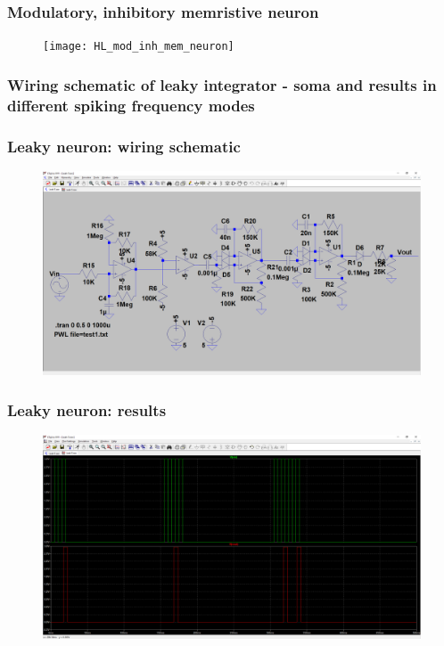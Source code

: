 \documentclass[12pt, aspectratio=169]{beamer}
\begin{document}
\begin{frame}
  \frametitle{Modulatory, inhibitory memristive neuron}
  \begin{figure}
    \texttt{[image: HL\_mod\_inh\_mem\_neuron]}
  \end{figure}
\end{frame}

\subsubsection{Wiring schematic of leaky integrator - soma and results in different spiking frequency modes}

\begin{frame}
\frametitle{Leaky neuron: wiring schematic}
\begin{figure}
\includegraphics[width=0.85\linewidth]{Leak_sch}
\end{figure}
\end{frame}


\begin{frame}
\frametitle{Leaky neuron: results}
\begin{figure}
\includegraphics[width=0.85\linewidth]{Leak_test}
\end{figure}
\end{frame}
\end{document}
